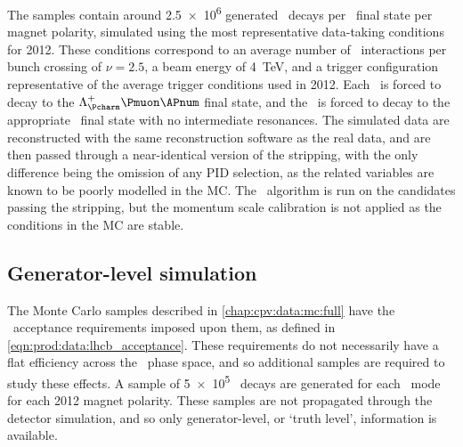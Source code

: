 The samples contain around \num{2.5e6} generated \PLambdab\ decays per 
\PLambdac\ final state per magnet polarity, simulated using the most 
representative data-taking conditions for 2012.
These conditions correspond to an average number of \pp\ interactions per bunch 
crossing of $\nu = 2.5$, a beam energy of \SI{4}{\TeV}, and a trigger 
configuration representative of the average trigger conditions used in 2012.
Each \PLambdab\ is forced to decay to the $\PLambdac\Pmuon\APnum$ final state, 
and the \PLambdac\ is forced to decay to the appropriate \phh\ final state with 
no intermediate resonances.
The simulated data are reconstructed with the same reconstruction software as 
the real data, and are then passed through a near-identical version of the 
stripping, with the only difference being the omission of any \ac{PID} 
selection, as the related variables are known to be poorly modelled in the 
\ac{MC}.
The \decaytreefitter\ algorithm is run on the candidates passing the stripping, 
but the momentum scale calibration is not applied as the conditions in the 
\ac{MC} are stable.

\subsection{Generator-level simulation}
\label{chap:cpv:data:mc:gen}

The Monte Carlo samples described in \cref{chap:cpv:data:mc:full} have the 
\lhcb\ acceptance requirements imposed upon them, as defined in 
\cref{eqn:prod:data:lhcb_acceptance}.
These requirements do not necessarily have a flat efficiency across the 
\LcTophh\ phase space, and so additional samples are required to study these 
effects.
A sample of \num{5e5} \LbToLcmunu\ decays are generated for each \LcTophh\ mode 
for each 2012 magnet polarity.
These samples are not propagated through the detector simulation, and so only 
generator-level, or `truth level', information is available.

\begin{table}
  \centering
  \caption{%
    Integrated luminosity for each data sample used in the analysis.
  }
  \label{tab:cpv:data:luminosity}
  
\end{table}
